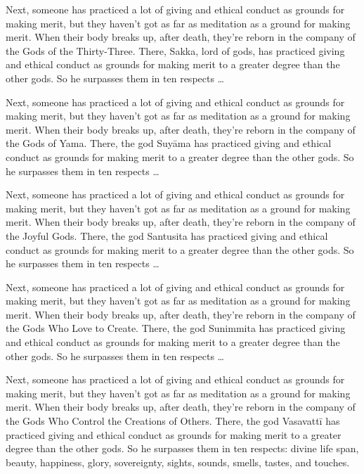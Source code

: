 \documentclass[12pt,openany]{book}%
\begin{document}
Next, someone has practiced a lot of giving and ethical conduct as grounds for making merit, but they haven’t got as far as meditation as a ground for making merit. When their body breaks up, after death, they’re reborn in the company of the Gods of the Thirty-Three. There, Sakka, lord of gods, has practiced giving and ethical conduct as grounds for making merit to a greater degree than the other gods. So he surpasses them in ten respects … 

Next, someone has practiced a lot of giving and ethical conduct as grounds for making merit, but they haven’t got as far as meditation as a ground for making merit. When their body breaks up, after death, they’re reborn in the company of the Gods of Yama. There, the god \textsanskrit{Suyāma} has practiced giving and ethical conduct as grounds for making merit to a greater degree than the other gods. So he surpasses them in ten respects … 

Next, someone has practiced a lot of giving and ethical conduct as grounds for making merit, but they haven’t got as far as meditation as a ground for making merit. When their body breaks up, after death, they’re reborn in the company of the Joyful Gods. There, the god Santusita has practiced giving and ethical conduct as grounds for making merit to a greater degree than the other gods. So he surpasses them in ten respects … 

Next, someone has practiced a lot of giving and ethical conduct as grounds for making merit, but they haven’t got as far as meditation as a ground for making merit. When their body breaks up, after death, they’re reborn in the company of the Gods Who Love to Create. There, the god Sunimmita has practiced giving and ethical conduct as grounds for making merit to a greater degree than the other gods. So he surpasses them in ten respects … 

Next, someone has practiced a lot of giving and ethical conduct as grounds for making merit, but they haven’t got as far as meditation as a ground for making merit. When their body breaks up, after death, they’re reborn in the company of the Gods Who Control the Creations of Others. There, the god \textsanskrit{Vasavattī} has practiced giving and ethical conduct as grounds for making merit to a greater degree than the other gods. So he surpasses them in ten respects: divine life span, beauty, happiness, glory, sovereignty, sights, sounds, smells, tastes, and touches. 
\end{document}
